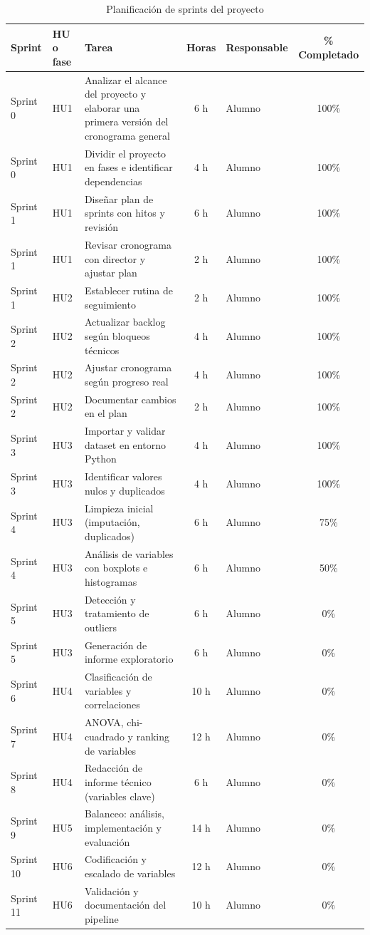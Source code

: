 \documentclass[
11pt, %
]{charter}
\begin{document}
\begin{table}[htpb]
\centering
\caption{Planificación de sprints del proyecto}
\begin{tabularx}{\linewidth}{@{}|l|l|X|c|l|c|@{}}
\hline
\rowcolor[HTML]{C0C0C0}
Sprint & HU o fase & Tarea & Horas & Responsable & \% Completado \\ \hline
Sprint 0 & HU1 & Analizar el alcance del proyecto y elaborar una primera versión del cronograma general & 6 h & Alumno & 100\% \\ \hline
Sprint 0 & HU1 & Dividir el proyecto en fases e identificar dependencias & 4 h & Alumno & 100\% \\ \hline
Sprint 1 & HU1 & Diseñar plan de sprints con hitos y revisión & 6 h & Alumno & 100\% \\ \hline
Sprint 1 & HU1 & Revisar cronograma con director y ajustar plan & 2 h & Alumno & 100\% \\ \hline
Sprint 1 & HU2 & Establecer rutina de seguimiento & 2 h & Alumno & 100\% \\ \hline
Sprint 2 & HU2 & Actualizar backlog según bloqueos técnicos & 4 h & Alumno & 100\% \\ \hline
Sprint 2 & HU2 & Ajustar cronograma según progreso real & 4 h & Alumno & 100\% \\ \hline
Sprint 2 & HU2 & Documentar cambios en el plan & 2 h & Alumno & 100\% \\ \hline
Sprint 3 & HU3 & Importar y validar dataset en entorno Python & 4 h & Alumno & 100\% \\ \hline
Sprint 3 & HU3 & Identificar valores nulos y duplicados & 4 h & Alumno & 100\% \\ \hline
Sprint 4 & HU3 & Limpieza inicial (imputación, duplicados) & 6 h & Alumno & 75\% \\ \hline
Sprint 4 & HU3 & Análisis de variables con boxplots e histogramas & 6 h & Alumno & 50\% \\ \hline
Sprint 5 & HU3 & Detección y tratamiento de outliers & 6 h & Alumno & 0\% \\ \hline
Sprint 5 & HU3 & Generación de informe exploratorio & 6 h & Alumno & 0\% \\ \hline
Sprint 6 & HU4 & Clasificación de variables y correlaciones & 10 h & Alumno & 0\% \\ \hline
Sprint 7 & HU4 & ANOVA, chi-cuadrado y ranking de variables & 12 h & Alumno & 0\% \\ \hline
Sprint 8 & HU4 & Redacción de informe técnico (variables clave) & 6 h & Alumno & 0\% \\ \hline
Sprint 9 & HU5 & Balanceo: análisis, implementación y evaluación & 14 h & Alumno & 0\% \\ \hline
Sprint 10 & HU6 & Codificación y escalado de variables & 12 h & Alumno & 0\% \\ \hline
Sprint 11 & HU6 & Validación y documentación del pipeline & 10 h & Alumno & 0\% \\ \hline
\end{tabularx}
\end{table}
\end{document}
